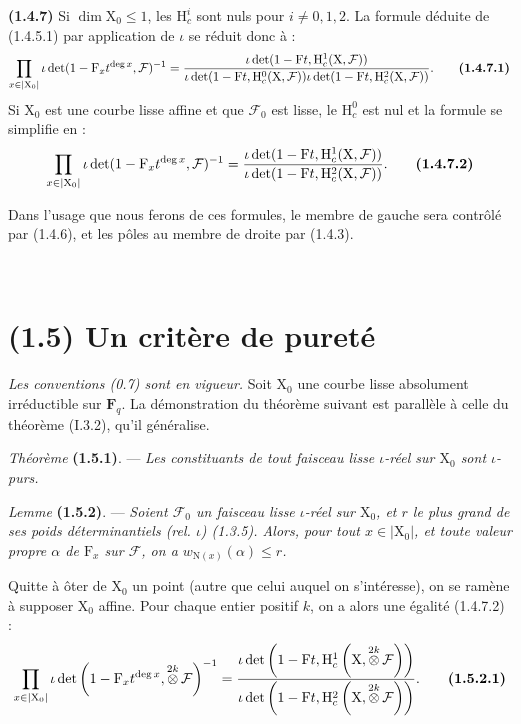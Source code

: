 \documentclass[11pt,leqno]{article}
\newcommand{\Page}[1]{\ifvmode\noindent\else\unskip\ \fi{\footnotesize\textcolor{gray}{[p.\,#1]}}\ \ignorespaces}
\begin{document}
\textbf{(1.4.7)} Si \(\dim\mathrm{X}_0\le1\), les \(\mathrm{H}_c^i\) sont nuls pour \(i\ne0,1,2\). La formule déduite de (1.4.5.1) par application de \(\iota\) se réduit donc à :
\[
\prod_{x\in|\mathrm{X}_0|}
\iota\det(1-\mathrm{F}_x t^{\deg x},\mathcal{F})^{-1}
=
\frac{\iota\det(1-\mathrm{F}t,\mathrm{H}_c^1(\mathrm{X},\mathcal{F}))}
{\iota\det(1-\mathrm{F}t,\mathrm{H}_c^0(\mathrm{X},\mathcal{F}))
 \iota\det(1-\mathrm{F}t,\mathrm{H}_c^2(\mathrm{X},\mathcal{F}))}.
\tag*{\textbf{(1.4.7.1)}}
\]
Si \(\mathrm{X}_0\) est une courbe lisse affine et que \(\mathcal{F}_0\) est lisse, le \(\mathrm{H}_c^0\) est nul et la formule se simplifie en :
\[
\prod_{x\in|\mathrm{X}_0|}
\iota\det(1-\mathrm{F}_x t^{\deg x},\mathcal{F})^{-1}
=
\frac{\iota\det(1-\mathrm{F}t,\mathrm{H}_c^1(\mathrm{X},\mathcal{F}))}
{\iota\det(1-\mathrm{F}t,\mathrm{H}_c^2(\mathrm{X},\mathcal{F}))}.
\tag*{\textbf{(1.4.7.2)}}
\]

Dans l’usage que nous ferons de ces formules, le membre de gauche sera contrôlé par (1.4.6), et les pôles au membre de droite par (1.4.3).

\Page{164}
\section*{(1.5) Un critère de pureté}

\textit{Les conventions \textup{(0.7)} sont en vigueur.} Soit \(\mathrm{X}_0\) une courbe lisse absolument irréductible sur \(\mathbf{F}_q\). La démonstration du théorème suivant est parallèle à celle du théorème (I.3.2), qu’il généralise.

\textit{Théorème} \textbf{(1.5.1)}. — \textit{Les constituants de tout faisceau lisse \(\iota\)-réel sur \(\mathrm{X}_0\) sont \(\iota\)-purs.}

\textit{Lemme} \textbf{(1.5.2)}. — \textit{Soient \(\mathcal{F}_0\) un faisceau lisse \(\iota\)-réel sur \(\mathrm{X}_0\), et \(r\) le plus grand de ses poids déterminantiels (rel. \(\iota\)) \textup{(1.3.5)}. Alors, pour tout \(x\in|\mathrm{X}_0|\), et toute valeur propre \(\alpha\) de \(\mathrm{F}_x\) sur \(\mathcal{F}\), on a \(w_{\mathrm{N}(x)}(\alpha)\le r\).}

Quitte à ôter de \(\mathrm{X}_0\) un point (autre que celui auquel on s’intéresse), on se ramène à supposer \(\mathrm{X}_0\) affine. Pour chaque entier positif \(k\), on a alors une égalité (1.4.7.2) :
\[
\prod_{x\in|\mathrm{X}_0|}
\iota\det\left(1-\mathrm{F}_x t^{\deg x},
 \mathop{\otimes}\limits^{2k}\mathcal{F}\right)^{-1}
=
\frac{\iota\det\left(1-\mathrm{F}t,
 \mathrm{H}_c^1\left(\mathrm{X},\mathop{\otimes}\limits^{2k}\mathcal{F}\right)\right)}
{\iota\det\left(1-\mathrm{F}t,
 \mathrm{H}_c^2\left(\mathrm{X},\mathop{\otimes}\limits^{2k}\mathcal{F}\right)\right)}.
\tag*{\textbf{(1.5.2.1)}}
\]
\end{document}

